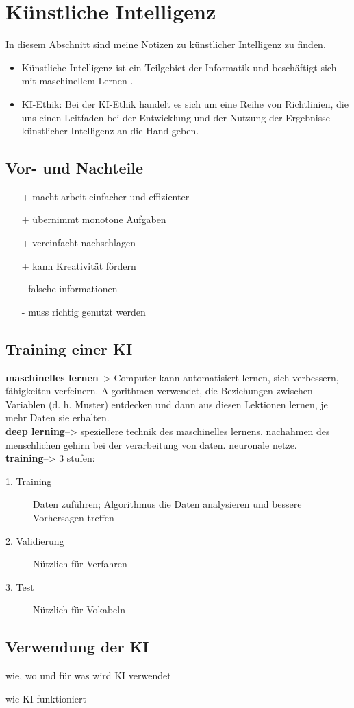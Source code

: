 \section{Künstliche Intelligenz}
\label{sec:ai}

In diesem Abschnitt sind meine Notizen zu künstlicher Intelligenz zu finden.

\begin{itemize}
    \item Künstliche Intelligenz ist ein Teilgebiet der Informatik und beschäftigt sich mit maschinellem Lernen \citep{ai-wikipedia}.
    \item KI-Ethik: Bei der KI-Ethik handelt es sich um eine Reihe von Richtlinien, die uns einen Leitfaden bei der Entwicklung und der Nutzung der Ergebnisse künstlicher Intelligenz an die Hand geben. \citep{ibm}
\end{itemize}

\subsection{Vor- und Nachteile} \citep{GitHub}
\begin{itemize}
    \item[+] macht arbeit einfacher und effizienter
    \item[+] übernimmt monotone Aufgaben
    \item[+] vereinfacht nachschlagen
    \item[+] kann Kreativität fördern
    \item[-] falsche informationen
    \item[-] muss richtig genutzt werden
\end{itemize}

\bigskip

\subsection{Training einer KI } \citep{KI-Training}
\textbf{maschinelles lernen}--> Computer kann automatisiert lernen, sich verbessern, fähigkeiten verfeinern.
Algorithmen verwendet, die Beziehungen zwischen Variablen (d. h. Muster) entdecken und dann aus diesen Lektionen lernen, je mehr Daten sie erhalten.\\
\textbf{deep lerning}--> speziellere technik des maschinelles lernens. nachahmen des menschlichen gehirn bei der verarbeitung von daten. neuronale netze.\\


\textbf{training}--> 3 stufen:
\begin{description}
    \item[1. Training] Daten zuführen; Algorithmus die Daten analysieren und bessere Vorhersagen treffen
    \item[2. Validierung] Nützlich für Verfahren
    \item[3. Test] Nützlich für Vokabeln
    \end{description}


\bigskip

\subsection{Verwendung der KI}
wie, wo und für was wird KI verwendet

wie KI funktioniert
